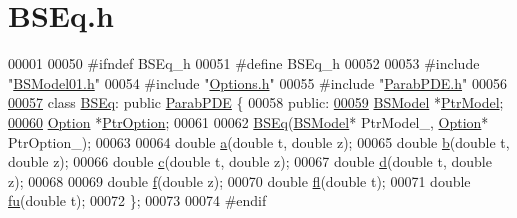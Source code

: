 \hypertarget{BSEq_8h_source}{\section{B\+S\+Eq.\+h}
}

\begin{DoxyCode}
00001 
00050 \textcolor{preprocessor}{#ifndef BSEq\_h}
00051 \textcolor{preprocessor}{#define BSEq\_h}
00052 
00053 \textcolor{preprocessor}{#include "\hyperlink{BSModel01_8h}{BSModel01.h}"}
00054 \textcolor{preprocessor}{#include "\hyperlink{Options_8h}{Options.h}"}
00055 \textcolor{preprocessor}{#include "\hyperlink{ParabPDE_8h}{ParabPDE.h}"}
00056 
\hypertarget{BSEq_8h_source_l00057}{}\hyperlink{classBSEq}{00057} \textcolor{keyword}{class }\hyperlink{classBSEq}{BSEq}: \textcolor{keyword}{public} \hyperlink{classParabPDE}{ParabPDE} \{
00058   \textcolor{keyword}{public}:
\hypertarget{BSEq_8h_source_l00059}{}\hyperlink{classBSEq_a44b63f8349d8ab91a1fb8fc026cdf142}{00059}     \hyperlink{classBSModel}{BSModel} *\hyperlink{classBSEq_a44b63f8349d8ab91a1fb8fc026cdf142}{PtrModel};
\hypertarget{BSEq_8h_source_l00060}{}\hyperlink{classBSEq_a280b15d8a4cd19d1aefc9feeb35a75bb}{00060}     \hyperlink{classOption}{Option} *\hyperlink{classBSEq_a280b15d8a4cd19d1aefc9feeb35a75bb}{PtrOption};
00061 
00062     \hyperlink{classBSEq_a3545b5fe078c573514666f07e3d516b2}{BSEq}(\hyperlink{classBSModel}{BSModel}* PtrModel\_, \hyperlink{classOption}{Option}* PtrOption\_);
00063 
00064     \textcolor{keywordtype}{double} \hyperlink{classBSEq_aac9b72618a86b764022bc2f8a0623b0c}{a}(\textcolor{keywordtype}{double} t, \textcolor{keywordtype}{double} z);
00065     \textcolor{keywordtype}{double} \hyperlink{classBSEq_a7b0a00c216ae383f5a768c8efd42e672}{b}(\textcolor{keywordtype}{double} t, \textcolor{keywordtype}{double} z);
00066     \textcolor{keywordtype}{double} \hyperlink{classBSEq_aa63fc29fedf4ef53ace9499fab4d7aba}{c}(\textcolor{keywordtype}{double} t, \textcolor{keywordtype}{double} z);
00067     \textcolor{keywordtype}{double} \hyperlink{classBSEq_ae01526739bc51e813dfdb880585aefc0}{d}(\textcolor{keywordtype}{double} t, \textcolor{keywordtype}{double} z);
00068 
00069     \textcolor{keywordtype}{double} \hyperlink{classBSEq_a6c81cef2ec102bc86bc8ff6378a2a519}{f}(\textcolor{keywordtype}{double} z);
00070     \textcolor{keywordtype}{double} \hyperlink{classBSEq_a5bde9ad3db5d94df77c78929de7f2717}{fl}(\textcolor{keywordtype}{double} t);
00071     \textcolor{keywordtype}{double} \hyperlink{classBSEq_acebc22c41d04659861ef346d988de565}{fu}(\textcolor{keywordtype}{double} t);
00072 \};
00073 
00074 \textcolor{preprocessor}{#endif}
\end{DoxyCode}
